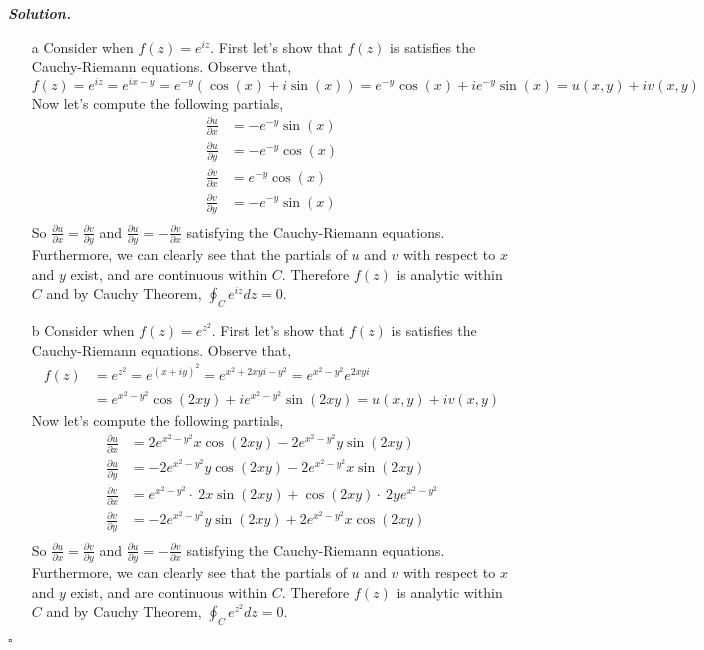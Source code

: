 \documentclass[12pt]{report}
\newenvironment{solution}[1][\it{Solution}]{\textbf{#1. } }{$\square$}
\begin{document}
\begin{solution}
    \noindent
    \begin{enumerate}
        \item [a] 
        Consider when $f(z) = e^{iz}$. First let's show that $f(z)$ is satisfies the Cauchy-Riemann equations. Observe that,
        $$f(z) = e^{iz} = e^{ix-y} =e^{-y}(\cos(x) + i\sin(x)) = e^{-y}\cos(x) + ie^{-y}\sin(x) = u(x,y) + iv(x,y)$$
        Now let's compute the following partials,
        \begin{align*}
            \frac{\partial u}{\partial x} &= -e^{-y}\sin(x)\\
            \frac{\partial u}{\partial y} &= -e^{-y}\cos(x)\\
            \frac{\partial v}{\partial x} &= e^{-y}\cos(x)\\
            \frac{\partial v}{\partial y} &= -e^{-y}\sin(x)\\
        \end{align*}
        So $\frac{\partial u}{\partial x} = \frac{\partial v}{\partial y}$ and $\frac{\partial u}{\partial y} = - \frac{\partial v}{\partial x}$ satisfying the Cauchy-Riemann equations. Furthermore, we can clearly see that the partials of $u$ and $v$ with respect to $x$ and $y$ exist, and are continuous within $C$. Therefore $f(z)$ is analytic within $C$ and by Cauchy Theorem, $\boxed{\oint_C e^{iz} dz = 0}$. 

        \item [b]
        Consider when $f(z) = e^{z^2}$. First let's show that $f(z)$ is satisfies the Cauchy-Riemann equations. Observe that,
        \begin{align*}
            f(z) &= e^{z^2} = e^{(x+iy)^2} = e^{x^2 + 2xyi - y^2} = e^{x^2 - y^2}e^{2xyi}\\ 
                &= e^{x^2 - y^2}\cos(2xy) + ie^{x^2 - y^2}\sin(2xy)= u(x,y) + iv(x,y)
        \end{align*}
        Now let's compute the following partials,
        \begin{align*}
            \frac{\partial u}{\partial x} &= 2e^{x^2-y^2}x\cos \left(2xy\right)-2e^{x^2-y^2}y\sin \left(2xy\right)\\
            \frac{\partial u}{\partial y} &= -2e^{x^2-y^2}y\cos \left(2xy\right)-2e^{x^2-y^2}x\sin \left(2xy\right)\\
            \frac{\partial v}{\partial x} &= e^{x^2-y^2}\cdot \:2x\sin \left(2xy\right)+\cos \left(2xy\right)\cdot \:2ye^{x^2-y^2}\\
            \frac{\partial v}{\partial y} &= -2e^{x^2-y^2}y\sin \left(2xy\right)+2e^{x^2-y^2}x\cos \left(2xy\right)\\
        \end{align*}
        So $\frac{\partial u}{\partial x} = \frac{\partial v}{\partial y}$ and $\frac{\partial u}{\partial y} = - \frac{\partial v}{\partial x}$ satisfying the Cauchy-Riemann equations. Furthermore, we can clearly see that the partials of $u$ and $v$ with respect to $x$ and $y$ exist, and are continuous within $C$. Therefore $f(z)$ is analytic within $C$ and by Cauchy Theorem, $\boxed{\oint_C e^{z^2}dz = 0}$.


\end{enumerate}
\end{solution}
\end{document}
